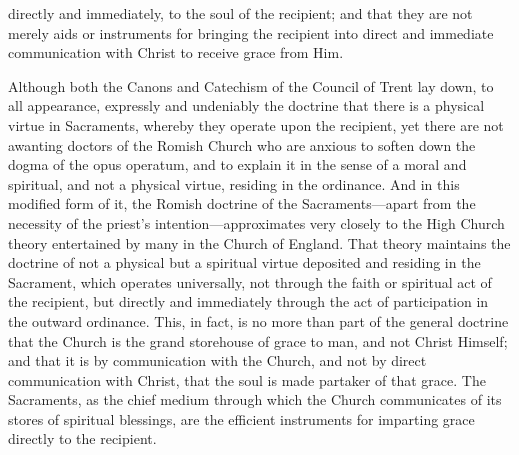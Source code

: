 \documentclass[]{book}
\begin{document}
directly and immediately, to the soul of the recipient; and that they are not merely aids or instruments for bringing the recipient into direct and immediate communication with Christ to receive grace from Him.

Although both the Canons and Catechism of the Council of Trent lay down, to all appearance, expressly and undeniably the doctrine that there is a physical virtue in Sacraments, whereby they operate upon the recipient, yet there are not awanting doctors of the Romish Church who are anxious to soften down the dogma of the opus operatum, and to explain it in the sense of a moral and spiritual, and not a physical virtue, residing in the ordinance. And in this modified form of it, the Romish doctrine of the Sacraments---apart from the necessity of the priest's intention---approximates very closely to the High Church theory entertained by many in the Church of England. That theory maintains the doctrine of not a physical but a spiritual virtue deposited and residing in the Sacrament, which operates universally, not through the faith or spiritual act of the recipient, but directly and immediately through the act of participation in the outward ordinance. This, in fact, is no more than part of the general doctrine that the Church is the grand storehouse of grace to man, and not Christ Himself; and that it is by communication with the Church, and not by direct communication with Christ, that the soul is made partaker of that grace. The Sacraments, as the chief medium through which the Church communicates of its stores of spiritual blessings, are the efficient instruments for imparting grace directly to the recipient.
\end{document}
